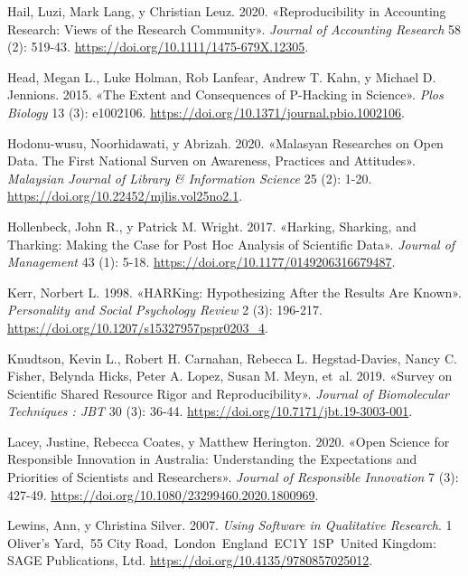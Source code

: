 \documentclass[
  letterpaper,
  DIV=11,
  numbers=noendperiod]{scrreprt}
\newlength{\cslhangindent}
\newlength{\cslentryspacingunit} %
\newenvironment{CSLReferences}[2] %
 {%
  \setlength{\parindent}{0pt}
  \ifodd #1
  \let\oldpar\par
  \def\par{\hangindent=\cslhangindent\oldpar}
  \fi
  \setlength{\parskip}{#2\cslentryspacingunit}
 }%
 {}
\begin{document}
\begin{CSLReferences}{1}{0}
\leavevmode{}%
Hail, Luzi, Mark Lang, y Christian Leuz. 2020. {«Reproducibility in
{Accounting Research}: {Views} of the {Research Community}»}.
\emph{Journal of Accounting Research} 58 (2): 519-43.
\url{https://doi.org/10.1111/1475-679X.12305}.

\leavevmode{}%
Head, Megan L., Luke Holman, Rob Lanfear, Andrew T. Kahn, y Michael D.
Jennions. 2015. {«The {Extent} and {Consequences} of {P-Hacking} in
{Science}»}. \emph{Plos Biology} 13 (3): e1002106.
\url{https://doi.org/10.1371/journal.pbio.1002106}.

\leavevmode{}%
Hodonu-wusu, Noorhidawati, y Abrizah. 2020. {«Malasyan Researches on
Open Data. {The} First National Surven on Awareness, Practices and
Attitudes»}. \emph{Malaysian Journal of Library \& Information Science}
25 (2): 1-20. \url{https://doi.org/10.22452/mjlis.vol25no2.1}.

\leavevmode{}%
Hollenbeck, John R., y Patrick M. Wright. 2017. {«Harking, {Sharking},
and {Tharking}: {Making} the {Case} for {Post Hoc Analysis} of
{Scientific Data}»}. \emph{Journal of Management} 43 (1): 5-18.
\url{https://doi.org/10.1177/0149206316679487}.

\leavevmode{}%
Kerr, Norbert L. 1998. {«{HARKing}: {Hypothesizing After} the {Results}
Are {Known}»}. \emph{Personality and Social Psychology Review} 2 (3):
196-217. \url{https://doi.org/10.1207/s15327957pspr0203_4}.

\leavevmode{}%
Knudtson, Kevin L., Robert H. Carnahan, Rebecca L. Hegstad-Davies, Nancy
C. Fisher, Belynda Hicks, Peter A. Lopez, Susan M. Meyn, et~al. 2019.
{«Survey on {Scientific Shared Resource Rigor} and {Reproducibility}»}.
\emph{Journal of Biomolecular Techniques : JBT} 30 (3): 36-44.
\url{https://doi.org/10.7171/jbt.19-3003-001}.

\leavevmode{}%
Lacey, Justine, Rebecca Coates, y Matthew Herington. 2020. {«Open
Science for Responsible Innovation in {Australia}: {Understanding} the
Expectations and Priorities of Scientists and Researchers»}.
\emph{Journal of Responsible Innovation} 7 (3): 427-49.
\url{https://doi.org/10.1080/23299460.2020.1800969}.

\leavevmode{}%
Lewins, Ann, y Christina Silver. 2007. \emph{Using {Software} in
{Qualitative Research}}. 1 Oliver's Yard,~55 City
Road,~London~England~EC1Y 1SP~United Kingdom: SAGE Publications, Ltd.
\url{https://doi.org/10.4135/9780857025012}.


\end{CSLReferences}
\end{document}
